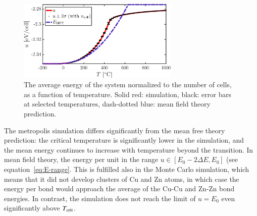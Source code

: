 \begin{figure}[!ht]
\begin{center}
  \includegraphics[width=0.7\textwidth]{../figures/U} 
  \caption{The average energy of the system normalized to the number of cells, as a function of temperature. Solid red: simulation, black: error bars at selected temperatures, dash-dotted blue: mean field theory prediction.}
  \label{fig:U}
\end{center}
\end{figure}

The metropolis simulation differs significantly from the mean free
theory prediction: the critical temperature is significantly lower in
the simulation, and the mean energy continues to increase with
temperature beyond the transition.
In mean field theory, the energy per unit  in the range
$u \in [E_0 - 2\Delta E,  E_0]$ (see equation~\eqref{eq:E-range}. This
is fulfilled also in the Monte Carlo simulation, which means that it
did not develop clusters of Cu and Zn atoms, in which case the energy
per bond would approach the average of the Cu-Cu and Zn-Zn bond
energies. In contrast, the simulation does not reach the limit of $u =
E_0$ even significantly above $T_{\rm crit}$.  


